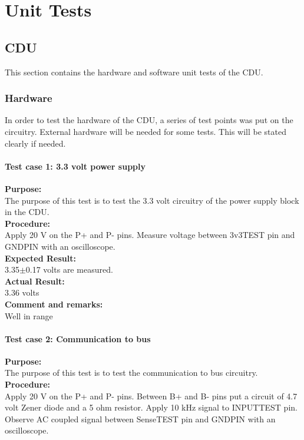\chapter{Unit Tests}
\section{CDU}
This section contains the hardware and software unit tests of the CDU.
\subsection{Hardware}
In order to test the hardware of the CDU, a series of test points was put on the circuitry. External hardware will be needed for some tests. This will be stated clearly if needed.
\subsubsection{Test case 1: 3.3 volt power supply}
\textbf{Purpose:}\\
The purpose of this test is to test the 3.3 volt circuitry of the power supply block in the CDU.\\

\textbf{Procedure:}\\
Apply 20 V on the P+ and P- pins. Measure voltage between 3v3TEST pin and GNDPIN with an oscilloscope.\\

\textbf{Expected Result:}\\
3.35$\pm$0.17 volts are measured.\\

\textbf{Actual Result:}\\
3.36 volts\\

\textbf{Comment and remarks:}\\
Well in range\\

\subsubsection{Test case 2: Communication to bus}
\textbf{Purpose:}\\
The purpose of this test is to test the communication to bus circuitry.\\

\textbf{Procedure:}\\
Apply 20 V on the P+ and P- pins. Between B+ and B- pins put a circuit of 4.7 volt Zener diode and a 5 ohm resistor. Apply 10 kHz signal to INPUTTEST pin. Observe AC coupled signal between SenseTEST pin and GNDPIN with an oscilloscope.\\

